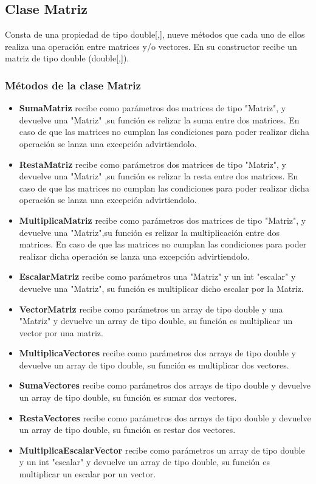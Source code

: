 \documentclass{article}
\begin{document}
\subsection{Clase Matriz }
Consta de una propiedad de tipo double[,], nueve métodos que cada uno de ellos realiza una operación entre matrices y/o vectores. 
En su constructor recibe un matriz de tipo double (double[,]).
\subsubsection{Métodos de la clase Matriz}
\begin{itemize}
    \item \textbf{SumaMatriz}  recibe como parámetros dos matrices de tipo "Matriz", y devuelve una "Matriz" ,su función es relizar 
    la suma entre dos matrices. En caso de que las matrices no cumplan las condiciones para poder realizar dicha operación se lanza 
    una excepción advirtiendolo.
    \item \textbf{RestaMatriz} recibe como parámetros dos matrices de tipo "Matriz", y devuelve una "Matriz" ,su función es relizar 
    la resta entre dos matrices. En caso de que las matrices no cumplan las condiciones para poder realizar dicha operación se lanza 
    una excepción advirtiendolo.
    \item \textbf{MultiplicaMatriz} recibe como parámetros dos matrices de tipo "Matriz", y devuelve una "Matriz",su función es relizar
     la multiplicación entre dos matrices. En caso de que las matrices no cumplan las condiciones para poder realizar dicha operación se 
     lanza una excepción advirtiendolo.
    \item \textbf{EscalarMatriz} recibe como parámetros una "Matriz" y un int "escalar" y devuelve una "Matriz", su función es multiplicar
      dicho escalar por la Matriz.
    \item \textbf{VectorMatriz} recibe como parámetros un array de tipo double y una "Matriz" y devuelve un array de tipo double, su función 
    es multiplicar un vector por una matriz.
    \item \textbf{MultiplicaVectores} recibe como parámetros dos arrays de tipo double y devuelve un array de tipo double, su función es multiplicar dos vectores.
    \item \textbf{SumaVectores} recibe como parámetros dos arrays de tipo double y devuelve un array de tipo double, su función es sumar dos vectores.
    \item \textbf{RestaVectores}  recibe como parámetros dos arrays de tipo double y devuelve un array de tipo double, su función es restar dos vectores.
    \item \textbf{MultiplicaEscalarVector} recibe como parámetros un array de tipo double y un int "escalar" y devuelve un array de tipo double, su función
     es multiplicar un escalar por un vector.
\end{itemize}
\end{document}
